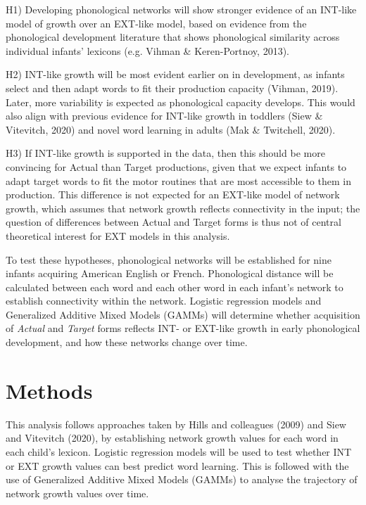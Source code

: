 \documentclass[
  man]{apa6}
\begin{document}
H1) Developing phonological networks will show stronger evidence of an INT-like model of growth over an EXT-like model, based on evidence from the phonological development literature that shows phonological similarity across individual infants' lexicons (e.g. Vihman \& Keren-Portnoy, 2013).

H2) INT-like growth will be most evident earlier on in development, as infants select and then adapt words to fit their production capacity (Vihman, 2019). Later, more variability is expected as phonological capacity develops. This would also align with previous evidence for INT-like growth in toddlers (Siew \& Vitevitch, 2020) and novel word learning in adults (Mak \& Twitchell, 2020).

H3) If INT-like growth is supported in the data, then this should be more convincing for Actual than Target productions, given that we expect infants to adapt target words to fit the motor routines that are most accessible to them in production. This difference is not expected for an EXT-like model of network growth, which assumes that network growth reflects connectivity in the input; the question of differences between Actual and Target forms is thus not of central theoretical interest for EXT models in this analysis.

To test these hypotheses, phonological networks will be established for nine infants acquiring American English or French. Phonological distance will be calculated between each word and each other word in each infant's network to establish connectivity within the network. Logistic regression models and Generalized Additive Mixed Models (GAMMs) will determine whether acquisition of \emph{Actual} and \emph{Target} forms reflects INT- or EXT-like growth in early phonological development, and how these networks change over time.

\hypertarget{methods}{%
\section{Methods}\label{methods}}

This analysis follows approaches taken by Hills and colleagues (2009) and Siew and Vitevitch (2020), by establishing network growth values for each word in each child's lexicon. Logistic regression models will be used to test whether INT or EXT growth values can best predict word learning. This is followed with the use of Generalized Additive Mixed Models (GAMMs) to analyse the trajectory of network growth values over time.
\end{document}
